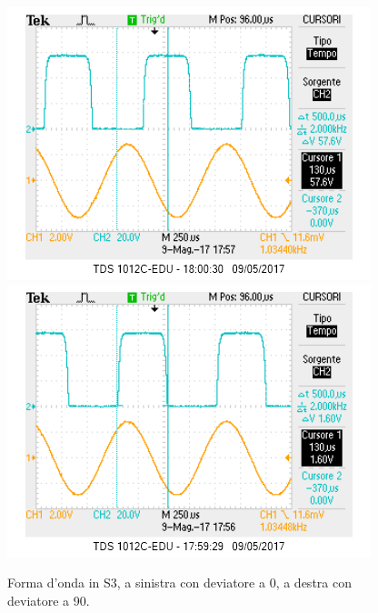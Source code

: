 \documentclass[10pt,a4paper]{article}
\begin{document}
\begin{figure}[!htb]
  \includegraphics[scale=0.75]{deviatore0.png}\includegraphics[scale=0.75]{deviatore90.png}
\caption{Forma d'onda in S3, a sinistra con deviatore a 0\degree, a destra con deviatore a 90\degree.\label{osc:dev}}
\end{figure}
\end{document}
